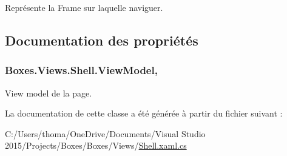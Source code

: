 Représente la Frame sur laquelle naviguer. 



\subsection{Documentation des propriétés}
\subsubsection[{\texorpdfstring{View\+Model}{ViewModel}}]{ Boxes.\+Views.\+Shell.\+View\+Model\hspace{0.3cm}{\ttfamily [get]}, {\ttfamily [private]}}\hypertarget{class_boxes_1_1_views_1_1_shell_a6b274fcc0d3ec20c8a20ac27ff0686e3}{}\label{class_boxes_1_1_views_1_1_shell_a6b274fcc0d3ec20c8a20ac27ff0686e3}


View model de la page. 



La documentation de cette classe a été générée à partir du fichier suivant \+:\begin{DoxyCompactItemize}
\item 
C\+:/\+Users/thoma/\+One\+Drive/\+Documents/\+Visual Studio 2015/\+Projects/\+Boxes/\+Boxes/\+Views/\hyperlink{_shell_8xaml_8cs}{Shell.\+xaml.\+cs}\end{DoxyCompactItemize}

